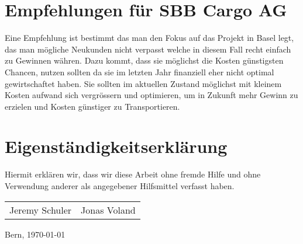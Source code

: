 \documentclass{article}
\begin{document}
\section{Empfehlungen für SBB Cargo AG}

Eine Empfehlung ist bestimmt das man den Fokus auf das Projekt in Basel legt, das man mögliche Neukunden nicht verpasst welche in diesem Fall recht einfach zu Gewinnen währen.
Dazu kommt, dass sie möglichst die Kosten günstigsten Chancen, nutzen sollten da sie im letzten Jahr finanziell eher nicht optimal gewirtschaftet haben.
Sie sollten im aktuellen Zustand möglichst mit kleinem Kosten aufwand sich vergrössern und optimieren, um in Zukunft mehr Gewinn zu erzielen und Kosten günstiger zu Transportieren. 

\section{Eigenständigkeitserklärung}

Hiermit erklären wir, dass wir diese Arbeit ohne fremde Hilfe und ohne Verwendung anderer als angegebener Hilfsmittel verfasst haben.

\begin{center}
\begin{tabular}{ c c }
    Jeremy Schuler & Jonas Voland\\
\end{tabular}
\end{center}
Bern, \today

\newpage

\printbibliography
\end{document}
